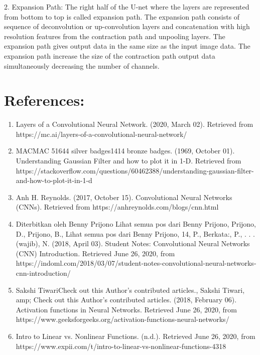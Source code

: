 \documentclass{IEEEtran}
\begin{document}
2. Expansion Path: The right half of the U-net where the layers are represented from bottom to top is called expansion path. The expansion path consists of sequence of deconvolution or up-convolution layers and concatenation with high resolution features from the contraction path and unpooling layers. The expansion path gives output data in the same size as the input image data. The expansion path increase the size of the contraction path output data simultaneously decreasing the number of channels.



\section{\textbf{References:}}
\begin{enumerate}
\item Layers of a Convolutional Neural Network. (2020, March 02). Retrieved from https://mc.ai/layers-of-a-convolutional-neural-network/

\item MACMAC 51644 silver badges1414 bronze badges. (1969, October 01). Understanding Gaussian Filter and how to plot it in 1-D. Retrieved from https://stackoverflow.com/questions/60462388/understanding-gaussian-filter-and-how-to-plot-it-in-1-d

\item Anh H. Reynolds. (2017, October 15). Convolutional Neural Networks (CNNs). Retrieved from https://anhreynolds.com/blogs/cnn.html

\item Diterbitkan oleh Benny Prijono Lihat semua pos dari Benny Prijono, Prijono, D., Prijono, B., Lihat semua pos dari Benny Prijono, 14, P., Berkata:, P., . . . (wajib), N. (2018, April 03). Student Notes: Convolutional Neural Networks (CNN) Introduction. Retrieved June 26, 2020, from https://indoml.com/2018/03/07/student-notes-convolutional-neural-networks-cnn-introduction/

\item Sakshi TiwariCheck out this Author's contributed articles., Sakshi Tiwari, amp; Check out this Author's contributed articles. (2018, February 06). Activation functions in Neural Networks. Retrieved June 26, 2020, from https://www.geeksforgeeks.org/activation-functions-neural-networks/

\item Intro to Linear vs. Nonlinear Functions. (n.d.). Retrieved June 26, 2020, from https://www.expii.com/t/intro-to-linear-vs-nonlinear-functions-4318


\end{enumerate}
\end{document}
